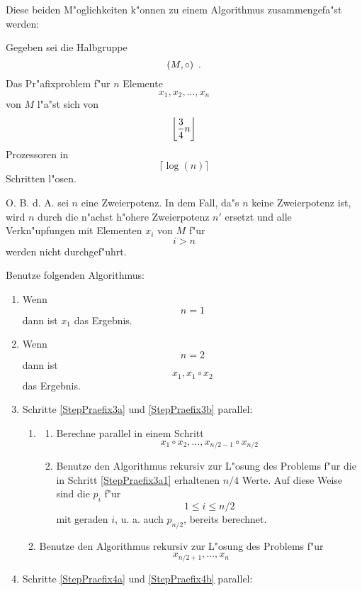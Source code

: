 Diese beiden M"oglichkeiten k"onnen zu einem Algorithmus zusammengefa"st
werden:
\begin{satz}
\label{SatzAlgPraefix}
    Gegeben sei die Halbgruppe \[ (M,\circ) \mbox{\hspace{0.5em}.} \] 
    Das Pr"afixproblem
    f"ur $n$ Elemente \[ x_1,x_2,\ldots,x_n \] von $M$ l"a"st sich
    von \[ \left\lfloor \frac{3}{4}n \right\rfloor \] Prozessoren in
    \[ \lceil \log(n) \rceil \] Schritten l"osen.
\end{satz}
\begin{beweis}
    O. B. d. A. sei $n$ eine Zweierpotenz. In dem Fall, da"s $n$ keine
    Zweierpotenz ist, wird $n$ durch die n"achst h"ohere Zweierpotenz $n'$
    ersetzt und alle Verkn"upfungen mit Elementen $x_i$ von $M$ f"ur
    \[ i>n \] werden nicht durchgef"uhrt. 

    Benutze folgenden Algorithmus:
    \begin{enumerate}
    \item
          Wenn \[ n=1 \] dann ist $x_1$ das Ergebnis.
    \item
          Wenn \[ n=2 \] dann ist \[ x_1, x_1 \circ x_2 \]
          das Ergebnis.
    \item
          Schritte \ref{StepPraefix3a} und \ref{StepPraefix3b} parallel:
          \begin{enumerate}
          \item \label{StepPraefix3a}
                \begin{enumerate}
                \item \label{StepPraefix3a1}
                      Berechne parallel in einem Schritt
                      \[ x_1 \circ x_2,\ldots,
                         x_{n/2-1} \circ x_{n/2}
                      \]
                \item \label{StepPraefix3a2}
                      Benutze den Algorithmus rekursiv zur L"osung des
                      Problems f"ur die in Schritt \ref{StepPraefix3a1}
                      erhaltenen $n/4$ Werte. Auf diese Weise sind die
                      $p_i$ f"ur
                      \[ 1 \leq i \leq n/2 \] mit geraden $i$, u. a.
                      auch $p_{n/2}$, bereits berechnet.
                \end{enumerate}
          \item \label{StepPraefix3b}
                Benutze den Algorithmus rekursiv zur L"osung des Problems
                f"ur \[ x_{n/2+1},\ldots,x_n \]
          \end{enumerate}
    \item Schritte \ref{StepPraefix4a} und \ref{StepPraefix4b} parallel:

\end{enumerate}
\end{beweis}
